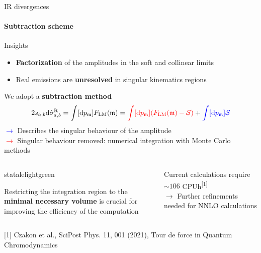 
\begin{frame} {IR divergences}
 \framesubtitle{Subtraction scheme}
Insights \\
\begin{itemize}
    \item \textbf{Factorization} of the amplitudes in the soft and collinear limits 
    \item Real emissions are \textbf{unresolved} in singular kinematics regions
\end{itemize}
 \vspace{0.5em}
 We adopt a \textbf{subtraction method}
\begin{equation*}
    2s_{a,b} \mathrm{d} \hat{\sigma}_{a,b}^{\mathrm{R}} = \int [\mathrm{d}p_{\mathfrak{m}}] F_{\mathrm{LM}} (\mathfrak{m})=  \textcolor{red}{\int [\mathrm{d}p_{\mathfrak{m}}] (F_{\mathrm{LM}}(\mathfrak{m}) - \mathcal{S})}  + \textcolor{blue}{\int [\mathrm{d}p_{\mathfrak{m}}] \mathcal{S}}
    \label{subtraction-flm}
\end{equation*}
\textcolor{blue}{$\to$} Describes the singular behaviour of the amplitude\\ 
\textcolor{red}{$\to$} Singular behaviour removed: numerical integration with Monte Carlo methods \\

\pause

  \begin{columns}

    \begin{column}{0.50\textwidth}
 \begin{colorblock}[black]{statalelightgreen}{}
\begin{center}
    Restricting the integration region to the \\\textbf{minimal necessary volume} is crucial for improving the efficiency of the computation
\end{center}
\end{colorblock}
    \end{column}

    \begin{column}{0.50\textwidth}
    \begin{center}
        Current calculations require $\sim 106$ CPUh\textsuperscript{[1]} \\
        $\to$ Further refinements needed for NNLO calculations 
    \end{center}
    \end{column}
    \end{columns}

\vspace{0.3em}
    {\tiny
[1] Czakon et al., SciPost Phys. 11, 001 (2021), Tour de force in Quantum Chromodynamics
}





\end{frame}

